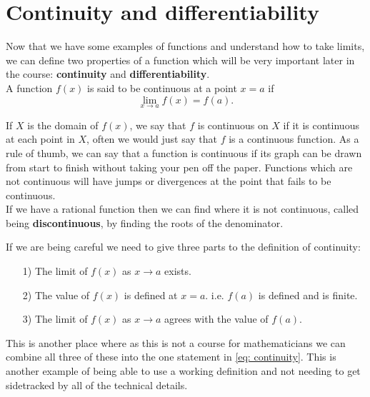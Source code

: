 \section{Continuity and differentiability}
\label{sec: continuity}
Now that we have some examples of functions and understand how to take limits, we can define two properties of a function which will be very important later in the course: \textbf{continuity} and \textbf{differentiability}. \\

A function $f(x)$ is said to be continuous at a point $x=a$ if
\begin{equation}
\lim_{x\to a}f(x)=f(a).
\label{eq: continuity}
\end{equation}

If $X$ is the domain of $f(x)$, we say that $f$ is continuous on $X$ if it is continuous at each point in $X$, often we would just say that $f$ is a continuous function. As a rule of thumb, we can say that a function is continuous if its graph can be drawn from start to finish without taking your pen off the paper. Functions which are not continuous will have jumps or divergences at the point that fails to be continuous.\\

If we have a rational function then we can find where it is not continuous, called being \textbf{discontinuous}, by finding the roots of the denominator.\\

\begin{mdiv}
If we are being careful we need to give three parts to the definition of continuity: 
\begin{itemize}
    \item[1)] The limit of $f(x)$ as $x\to a$ exists.
    \item[2)] The value of $f(x)$ is defined at $x=a$. i.e. $f(a)$ is defined and is finite.
   \item[3)] The limit of $f(x)$ as $x\to a$ agrees with the value of $f(a)$.
\end{itemize}
This is another place where as this is not a course for mathematicians we can combine all three of these into the one statement in \cref{eq: continuity}. This is another example of being able to use a working definition and not needing to get sidetracked by all of the technical details.
\end{mdiv}

